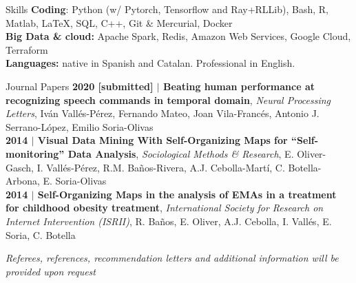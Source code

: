 \documentclass{resume} %
\begin{document}


\begin{rSection}{Skills} \itemsep -3pt
{\textbf{Coding}: Python (w/ Pytorch, Tensorflow and Ray+RLLib), Bash, R, Matlab, \LaTeX, SQL, C++, Git \& Mercurial, Docker}  \\
{\textbf{Big Data \& cloud:} Apache Spark, Redis, Amazon Web Services, Google Cloud, Terraform} \\
{\textbf{Languages:} native in Spanish and Catalan. Professional in English.}
\end{rSection}



\begin{rSection}{Journal Papers}
{\textbf{{2020} [submitted] $|$ Beating human performance at recognizing speech commands in temporal domain}, \textit{Neural Processing Letters}, Iván Vallés-Pérez, Fernando Mateo, Joan Vila-Francés, Antonio J. Serrano-López, Emilio Soria-Olivas}\\
{\textbf{{2014} $|$ Visual Data Mining With Self-Organizing Maps for ``Self-monitoring'' Data Analysis}, \textit{Sociological Methods \& Research}, E. Oliver-Gasch, I. Vallés-Pérez, R.M. Baños-Rivera, A.J. Cebolla-Martí, C. Botella-Arbona, E. Soria-Olivas}\\
{\textbf{{2014} $|$ Self-Organizing Maps in the analysis of EMAs in a treatment for childhood obesity treatment}, \textit{International Society for Research on Internet Intervention (ISRII)}, R. Baños, E. Oliver, A.J. Cebolla, I. Vallés, E. Soria, C. Botella}

\end{rSection}

\vspace{\fill}
\begin{flushright}
	\small{\textit{Referees, references, recommendation letters and additional information will be provided upon request}}
\end{flushright}
\end{document}
